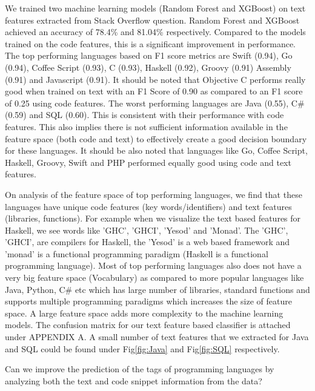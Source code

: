 \documentclass[letterpaper, 10 pt, conference]{ieeeconf}  %
\begin{document}
We trained two machine learning models (Random Forest and XGBoost) on text features extracted from Stack Overflow question. Random Forest and XGBoost achieved an accuracy of 78.4\% and 81.04\% respectively. Compared to the models trained on the code features, this is a significant improvement in performance.  The top performing languages based on F1 score metrics are Swift (0.94), Go (0.94), Coffee Script (0.93), C (0.93), Haskell (0.92), Groovy (0.91) Assembly (0.91) and Javascript (0.91).  It should be noted that Objective C performs really good when trained on text with an F1 Score of 0.90 as compared to an F1 score of 0.25 using code features. The worst performing languages are Java (0.55), C\# (0.59) and SQL (0.60). This is consistent with their performance with code features. This also implies there is not sufficient information available in the feature space (both code and text) to effectively create a good decision boundary for these languages.  It should be also noted that languages like Go, Coffee Script, Haskell, Groovy, Swift and PHP performed equally good using code and text features. 

On analysis of the feature space of top performing languages, we find that these languages have unique code features (key words/identifiers) and text features (libraries, functions). For example when we visualize the text based features for Haskell, we see words like 'GHC', 'GHCI', 'Yesod' and 'Monad'. The 'GHC', 'GHCI', are compilers for Haskell, the 'Yesod' is a web based framework and 'monad' is a functional programming paradigm (Haskell is a functional programming language). Most of top performing languages also does not have a very big feature space (Vocabulary) as compared to more popular languages like Java, Python, C\# etc which has large number of libraries, standard functions and supports multiple programming paradigms which increases the size of feature space. A large feature space adds more complexity to the machine learning models. The confusion matrix for our text feature based classifier is attached under APPENDIX A. A small number of text features that we extracted for Java and SQL could be found under Fig\ref{fig:Java} and Fig\ref{fig:SQL} respectively.


\begin{res}
Can we improve the prediction of the tags of programming languages by analyzing both the text and code snippet information from the data?
\end{res}
\end{document}

